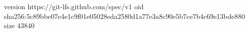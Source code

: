 version https://git-lfs.github.com/spec/v1
oid sha256:5c89bbe07e4e1c9f01e05028eda2580d1a77e3a8c90e5b7ce7b4c69e13bde880
size 43840
